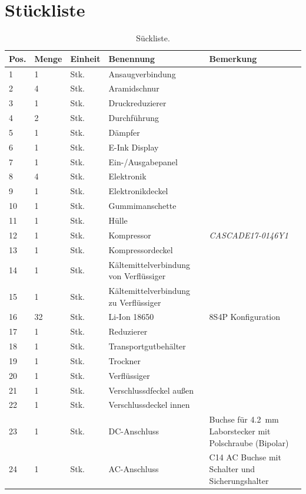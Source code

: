 	\section{Stückliste}
		\begin{table}[h]
			\centering
			\caption[Stückliste]{Sückliste.}
			\begin{tabular}[c]{@{}p{.05\textwidth}p{}p{}p{.4\textwidth}p{}@{}}
				\toprule
				Pos. & Menge & Einheit & Benennung & Bemerkung\\
				\midrule
				1&1&Stk.&Ansaugverbindung& \\
				2&4&Stk.&Aramidschnur& \\
				3&1&Stk.&Druckreduzierer& \\
				4&2&Stk.&Durchführung&\\
				5&1&Stk.&Dämpfer&\\
				6&1&Stk.&E-Ink Display& \\
				7&1&Stk.&Ein-/Ausgabepanel& \\
				8&4&Stk.&Elektronik& \\
				9&1&Stk.&Elektronikdeckel& \\
				10&1&Stk.&Gummimanschette& \\
				11&1&Stk.&Hülle&\\
				12&1&Stk.&Kompressor&\textit{CASCADE17-0146Y1}\\
				13&1&Stk.&Kompressordeckel& \\
				14&1&Stk.&Kältemittelverbindung von Verflüssiger& \\
				15&1&Stk.&Kältemittelverbindung zu Verflüssiger& \\
				16&32&Stk.&Li-Ion 18650&8S4P Konfiguration\\
				17&1&Stk.&Reduzierer& \\
				18&1&Stk.&Transportgutbehälter&\\
				19&1&Stk.&Trockner&\\
				20&1&Stk.&Verflüssiger&\\
				21&1&Stk.&Verschlussdfeckel außen&\\
				22&1&Stk.&Verschlussdeckel innen&\\
				23&1&Stk.&DC-Anschluss&Buchse für \SI{4,2}{mm} Laborstecker mit Polschraube (Bipolar)\\
				24&1&Stk.&AC-Anschluss&C14 AC Buchse mit Schalter und Sicherungshalter\\
				\bottomrule
			\end{tabular}
		\end{table}